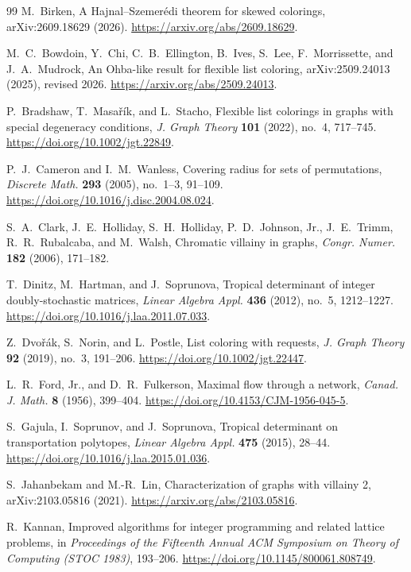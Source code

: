 \documentclass[11pt,reqno]{amsart}
\numberwithin{equation}{section}
\theoremstyle{definition}
\theoremstyle{remark}
\begin{document}
\begin{thebibliography}{99}
M.~Birken,
A Hajnal--Szemer\'edi theorem for skewed colorings,
arXiv:2609.18629 (2026).
\url{https://arxiv.org/abs/2609.18629}.

M.~C.~Bowdoin, Y.~Chi, C.~B.~Ellington, B.~Ives, S.~Lee,
F.~Morrissette, and J.~A.~Mudrock,
An Ohba-like result for flexible list coloring,
arXiv:2509.24013 (2025), revised 2026.
\url{https://arxiv.org/abs/2509.24013}.

P.~Bradshaw, T.~Masa\v{r}\'ik, and L.~Stacho,
Flexible list colorings in graphs with special degeneracy conditions,
\emph{J. Graph Theory} \textbf{101} (2022), no.~4, 717--745.
\url{https://doi.org/10.1002/jgt.22849}.

P.~J.~Cameron and I.~M.~Wanless,
Covering radius for sets of permutations,
\emph{Discrete Math.} \textbf{293} (2005), no.~1--3, 91--109.
\url{https://doi.org/10.1016/j.disc.2004.08.024}.

S.~A.~Clark, J.~E.~Holliday, S.~H.~Holliday, P.~D.~Johnson, Jr.,
J.~E.~Trimm, R.~R.~Rubalcaba, and M.~Walsh,
Chromatic villainy in graphs,
\emph{Congr. Numer.} \textbf{182} (2006), 171--182.

T.~Dinitz, M.~Hartman, and J.~Soprunova,
Tropical determinant of integer doubly-stochastic matrices,
\emph{Linear Algebra Appl.} \textbf{436} (2012), no.~5, 1212--1227.
\url{https://doi.org/10.1016/j.laa.2011.07.033}.

Z.~Dvo\v{r}\'ak, S.~Norin, and L.~Postle,
List coloring with requests,
\emph{J. Graph Theory} \textbf{92} (2019), no.~3, 191--206.
\url{https://doi.org/10.1002/jgt.22447}.

L.~R.~Ford, Jr., and D.~R.~Fulkerson,
Maximal flow through a network,
\emph{Canad. J. Math.} \textbf{8} (1956), 399--404.
\url{https://doi.org/10.4153/CJM-1956-045-5}.

S.~Gajula, I.~Soprunov, and J.~Soprunova,
Tropical determinant on transportation polytopes,
\emph{Linear Algebra Appl.} \textbf{475} (2015), 28--44.
\url{https://doi.org/10.1016/j.laa.2015.01.036}.

S.~Jahanbekam and M.-R.~Lin,
Characterization of graphs with villainy 2,
arXiv:2103.05816 (2021).
\url{https://arxiv.org/abs/2103.05816}.

R.~Kannan,
Improved algorithms for integer programming and related lattice problems,
in \emph{Proceedings of the Fifteenth Annual ACM Symposium on
Theory of Computing (STOC 1983)}, 193--206.
\url{https://doi.org/10.1145/800061.808749}.


\end{thebibliography}
\end{document}
